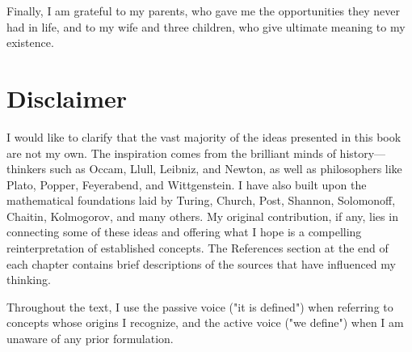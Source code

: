 Finally, I am grateful to my parents, who gave me the opportunities they never had in life, and to my wife and three children, who give ultimate meaning to my existence.

%
%

\section*{Disclaimer}

I would like to clarify that the vast majority of the ideas presented in this book are not my own. The inspiration comes from the brilliant minds of history—thinkers such as Occam, Llull, Leibniz, and Newton, as well as philosophers like Plato, Popper, Feyerabend, and Wittgenstein. I have also built upon the mathematical foundations laid by Turing, Church, Post, Shannon, Solomonoff, Chaitin, Kolmogorov, and many others. My original contribution, if any, lies in connecting some of these ideas and offering what I hope is a compelling reinterpretation of established concepts. The References section at the end of each chapter contains brief descriptions of the sources that have influenced my thinking.

Throughout the text, I use the passive voice ("it is defined") when referring to concepts whose origins I recognize, and the active voice ("we define") when I am unaware of any prior formulation.


